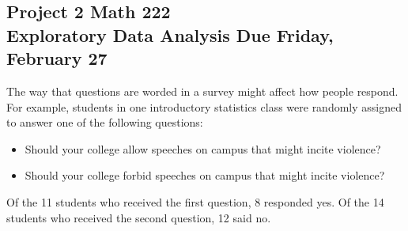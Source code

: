 \documentclass[12pt]{exam}
\begin{document}
\subsection*{Project 2 \hfill Math 222 \\ Exploratory Data Analysis \hfill Due Friday, February 27}

\begin{questions}


\question The way that questions are worded in a survey might affect how people respond.  For example, students in one introductory statistics class were randomly assigned to answer one of the following questions:

\begin{itemize}
\item Should your college allow speeches on campus that might incite violence?
\item  Should your college forbid speeches on campus that might incite violence?
\end{itemize}

Of the 11 students who received the first question, 8 responded yes. Of the 14 students who received the
second question, 12 said no.
\end{questions}
\end{document}
